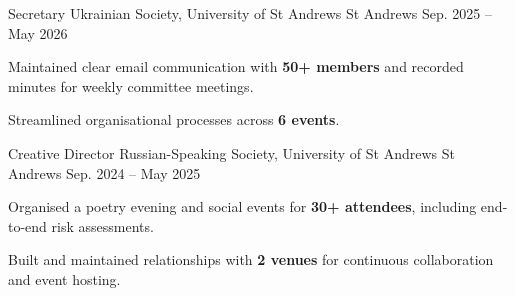 

\begin{cventries}

  \cventry
    {Secretary} %
    {Ukrainian Society, University of St Andrews} %
    {St Andrews} %
    {Sep. 2025 -- May 2026} %
    {
      \begin{cvitems}
        \item {Maintained clear email communication with \textbf{50+ members} and recorded minutes for weekly committee meetings.}
        \item {Streamlined organisational processes across \textbf{6 events}.}
      \end{cvitems}
    }

  \cventry
    {Creative Director} %
    {Russian-Speaking Society, University of St Andrews} %
    {St Andrews} %
    {Sep. 2024 -- May 2025} %
    {
      \begin{cvitems}
        \item {Organised a poetry evening and social events for \textbf{30+ attendees}, including end-to-end risk assessments.}
        \item {Built and maintained relationships with \textbf{2 venues} for continuous collaboration and event hosting.}
      \end{cvitems}
    }

\end{cventries}
